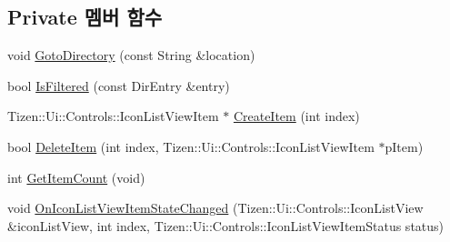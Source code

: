 \subsection*{Private 멤버 함수}
\begin{DoxyCompactItemize}
\item 
void \hyperlink{class_folder_browser_a00c58611b113347764a8ca6bb7b14eca}{Goto\+Directory} (const String \&location)
\item 
bool \hyperlink{class_folder_browser_a24d476da0efca9d46c266108d9e33d88}{Is\+Filtered} (const Dir\+Entry \&entry)
\item 
Tizen\+::\+Ui\+::\+Controls\+::\+Icon\+List\+View\+Item $\ast$ \hyperlink{class_folder_browser_a450f16854bed46a798766de035ed3428}{Create\+Item} (int index)
\item 
bool \hyperlink{class_folder_browser_aba37eeb02c62176b3f45c355bbc3dbab}{Delete\+Item} (int index, Tizen\+::\+Ui\+::\+Controls\+::\+Icon\+List\+View\+Item $\ast$p\+Item)
\item 
int \hyperlink{class_folder_browser_a9191a4ed55e873c6586c5a53ca908d12}{Get\+Item\+Count} (void)
\item 
void \hyperlink{class_folder_browser_acf642ba00f99bbb408a2ea6399eb768b}{On\+Icon\+List\+View\+Item\+State\+Changed} (Tizen\+::\+Ui\+::\+Controls\+::\+Icon\+List\+View \&icon\+List\+View, int index, Tizen\+::\+Ui\+::\+Controls\+::\+Icon\+List\+View\+Item\+Status status)
\end{DoxyCompactItemize}
